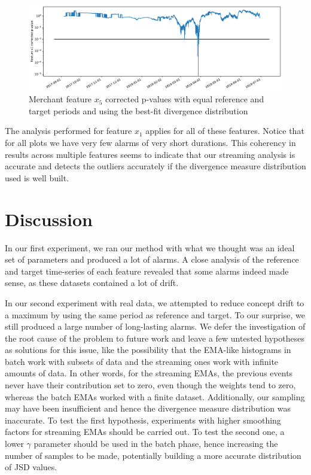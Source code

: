 \documentclass[sigconf]{acmart}
\begin{document}
\begin{figure}[!htb]
    \begin{center}
      \includegraphics[scale=0.25]{figures/merchant3-x5-correctedpvalues.pdf}
      \caption{Merchant feature $x_5$ corrected p-values with equal reference and target periods and using the best-fit divergence distribution}
      \label{fig:merchant3-x5-correctedpvalues}
    \end{center}
\end{figure}
The analysis performed for feature $x_1$ applies for all of these features. Notice that for all plots we have very few alarms of very short durations. This coherency in results across multiple features seems to indicate that our streaming analysis is accurate and detects the outliers accurately if the divergence measure distribution used is well built.


\section{Discussion} \label{sec:Discussion}
In our first experiment, we ran our method with what we thought was an ideal set of parameters and produced a lot of alarms. A close analysis of the reference and target time-series of each feature revealed that some alarms indeed made sense, as these datasets contained a lot of drift. 

In our second experiment with real data, we attempted to reduce concept drift to a maximum by using the same period as reference and target. To our surprise, we still produced a large number of long-lasting alarms. We defer the investigation of the root cause of the problem to future work and leave a few untested hypotheses as solutions for this issue, like the possibility that the EMA-like histograms in batch work with subsets of data and the streaming ones work with infinite amounts of data. In other words, for the streaming EMAs, the previous events never have their contribution set to zero, even though the weights tend to zero, whereas the batch EMAs worked with a finite dataset. Additionally, our sampling may have been insufficient and hence the divergence measure distribution was inaccurate. To test the first hypothesis, experiments with higher smoothing factors for streaming EMAs should be carried out. To test the second one, a lower $\gamma$ parameter should be used in the batch phase, hence increasing the number of samples to be made, potentially building a more accurate distribution of JSD values.
\end{document}
